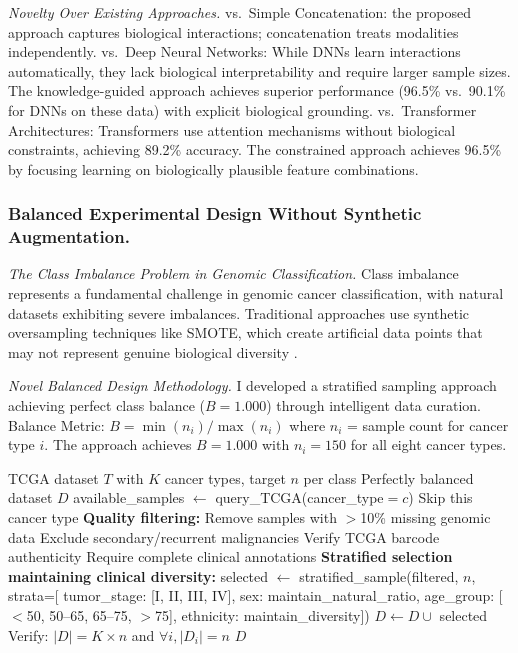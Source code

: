 \documentclass[manuscript, screen, review]{jair}
\begin{document}
\emph{Novelty Over Existing Approaches.} vs.\ Simple Concatenation: the proposed approach captures biological interactions; concatenation treats modalities independently. vs.\ Deep Neural Networks: While DNNs learn interactions automatically, they lack biological interpretability and require larger sample sizes. The knowledge-guided approach achieves superior performance (96.5\% vs.\ 90.1\% for DNNs on these data) with explicit biological grounding. vs.\ Transformer Architectures: Transformers \citep{chen2022pancancer} use attention mechanisms without biological constraints, achieving 89.2\% accuracy. The constrained approach achieves 96.5\% by focusing learning on biologically plausible feature combinations.

\subsubsection{Balanced Experimental Design Without Synthetic Augmentation.}
\label{sec:balance}

\emph{The Class Imbalance Problem in Genomic Classification.} Class imbalance represents a fundamental challenge in genomic cancer classification, with natural datasets exhibiting severe imbalances. Traditional approaches use synthetic oversampling techniques like SMOTE, which create artificial data points that may not represent genuine biological diversity \citep{haixiang2017learning,krawczyk2016learning}.

\emph{Novel Balanced Design Methodology.} I developed a stratified sampling approach achieving perfect class balance ($B = 1.000$) through intelligent data curation. Balance Metric: $B = \min(n_i) / \max(n_i)$ where $n_i$ = sample count for cancer type $i$. The approach achieves $B = 1.000$ with $n_i = 150$ for all eight cancer types.

\begin{algorithm}[!t]
\caption{Perfect Balance Achievement Through Intelligent Curation}
\label{alg:balance}
\begin{algorithmic}[1]
\Require TCGA dataset $T$ with $K$ cancer types, target $n$ per class
\Ensure Perfectly balanced dataset $D$
  \State available\_samples $\gets$ query\_TCGA(cancer\_type$=c$)
    \State Skip this cancer type
  \EndIf
  \State \textbf{Quality filtering:}
  \State \quad Remove samples with $>$10\% missing genomic data
  \State \quad Exclude secondary/recurrent malignancies
  \State \quad Verify TCGA barcode authenticity
  \State \quad Require complete clinical annotations
  \State \textbf{Stratified selection maintaining clinical diversity:}
  \State selected $\gets$ stratified\_sample(filtered, $n$, strata=[
  \State \quad tumor\_stage: [I, II, III, IV],
  \State \quad sex: maintain\_natural\_ratio,
  \State \quad age\_group: [$<$50, 50--65, 65--75, $>$75],
  \State \quad ethnicity: maintain\_diversity])
  \State $D \gets D \cup$ selected
\EndFor
\State Verify: $|D| = K \times n$ and $\forall i, |D_i| = n$
\State \Return $D$
\end{algorithmic}
\end{algorithm}
\end{document}
